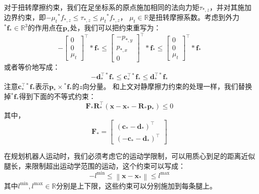 对于扭转摩擦约束，我们在足坐标系的原点施加相同的法向力矩$\tau_{*, z}$，并对其施加边界约束，即$-\mu_t{ }^* f_{*, z} \leq \tau_{*, z} \leq \mu_t{ }^* f_{*, z}$，
$\mu_t \in \mathbb{R}$是扭转摩擦系数。考虑到外力${ }^* \boldsymbol{f}_* \in \mathbb{R}^{3}$的作用点在$\boldsymbol{p}_*$处，我们可以把约束重写为：
\begin{equation}
    \label{equ:friction_final}
    -\left[\begin{array}{c}
        0 \\
        0 \\
        \mu_t
        \end{array}\right]^{\top} * \boldsymbol{f}_* \leq\left[\begin{array}{c}
        -p_{*, y} \\
        p_{*, x} \\
        0
        \end{array}\right]^{\top} * \boldsymbol{f}_* \leq\left[\begin{array}{c}
        0 \\
        0 \\
        \mu_t
        \end{array}\right]^{\top} * \boldsymbol{f}_*
\end{equation}
或者等价地写成：
\begin{equation}
    \label{equ:friction_vector}
    -\boldsymbol{d}_*^{\top *} \boldsymbol{f}_* \leq \boldsymbol{c}_*^{\top *} \boldsymbol{f}_* \leq \boldsymbol{d}_*^{\top *} \boldsymbol{f}_*
\end{equation}
注意$\boldsymbol{c}_*^{\top *} \boldsymbol{f}_*$表示$\boldsymbol{p}_* \times { }^* \boldsymbol{f}_*$的$z$向分量。
和上文对静摩擦力约束的处理一样，我们替换掉${ }^* \boldsymbol{f}_*$得到下面的不等式约束：
\begin{equation}
    \label{equ:friction_stack}
    \boldsymbol{F}_* \boldsymbol{R}_*^{\top}\left(\boldsymbol{x}-\boldsymbol{x}_*-\boldsymbol{R}_* \boldsymbol{p}_*\right) \leq 0
\end{equation}
其中，
\begin{equation}
    \label{equ:friction_F}
    \boldsymbol{F}_*=\left[\begin{array}{c}
        \left(\boldsymbol{c}_*-\boldsymbol{d}_*\right)^{\top} \\
        \left(-\boldsymbol{c}_*-\boldsymbol{d}_*\right)^{\top}
        \end{array}\right]
\end{equation}

在规划机器人运动时，我们必须考虑它的运动学限制，可以用质心到足的距离近似腿长，来限制超出运动学范围的运动，这个约束可以写成：
\begin{equation}
    \label{equ:kine_constraint}
    -l^{\min } \leq\left\|\boldsymbol{x}-\boldsymbol{x}_*\right\| \leq l^{\max }
\end{equation}
其中$l^{\min}, l^{\max} \in \mathbb{R}$分别是上下限，这些约束可以分别施加到每条腿上。

